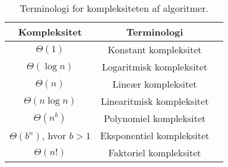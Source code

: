 \begin{table}[h]
 \begin{center}
  \begin{tabular}{|c|c|c|}
   \hline
   Kompleksitet & Terminologi\\
   \hline
   $\Theta(1)$ & Konstant kompleksitet\\
   $\Theta(\log n)$ & Logaritmisk kompleksitet\\
   $\Theta(n)$ & Lineær kompleksitet\\
   $\Theta(n \log n)$ & Linearitmisk kompleksitet\\
   $\Theta(n^b)$ & Polynomiel kompleksitet\\
   $\Theta(b^n)$, hvor $b>1$ & Eksponentiel kompleksitet\\
   $\Theta(n!)$ & Faktoriel kompleksitet\\
   \hline
  \end{tabular}
 \end{center}
 \caption{Terminologi for kompleksiteten af algoritmer.}
 \label{tab_complex}
\end{table}